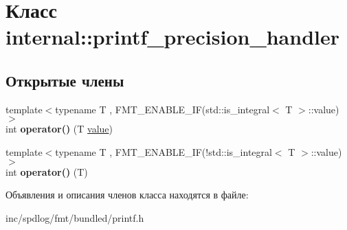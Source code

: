 \hypertarget{classinternal_1_1printf__precision__handler}{}\section{Класс internal\+:\+:printf\+\_\+precision\+\_\+handler}
\label{classinternal_1_1printf__precision__handler}
\subsection*{Открытые члены}
\begin{DoxyCompactItemize}
\item 
\mbox{\label{classinternal_1_1printf__precision__handler_a9046851700e4ba729d4ea98aa509560a}} 
{\footnotesize template$<$typename T , F\+M\+T\+\_\+\+E\+N\+A\+B\+L\+E\+\_\+\+I\+F(std\+::is\+\_\+integral$<$ T $>$\+::value) $>$ }\\int {\bfseries operator()} (T \hyperlink{classinternal_1_1value}{value})
\item 
\mbox{\label{classinternal_1_1printf__precision__handler_a14b163a3584ab3a954e4a68b456a5701}} 
{\footnotesize template$<$typename T , F\+M\+T\+\_\+\+E\+N\+A\+B\+L\+E\+\_\+\+I\+F(!std\+::is\+\_\+integral$<$ T $>$\+::value) $>$ }\\int {\bfseries operator()} (T)
\end{DoxyCompactItemize}


Объявления и описания членов класса находятся в файле\+:\begin{DoxyCompactItemize}
\item 
inc/spdlog/fmt/bundled/printf.\+h\end{DoxyCompactItemize}
